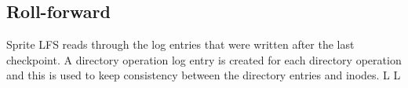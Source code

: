 \subsection{Roll-forward}
Sprite LFS reads through the log entries that were written after the last checkpoint. A directory operation log entry is created for each directory operation and this is used to keep consistency between the directory entries and inodes.
\vfill \smallskip
\supereject
\if L\lr \else\null\vfill\eject\fi
\if L\lr \else\null\vfill\eject\fi
\bye

